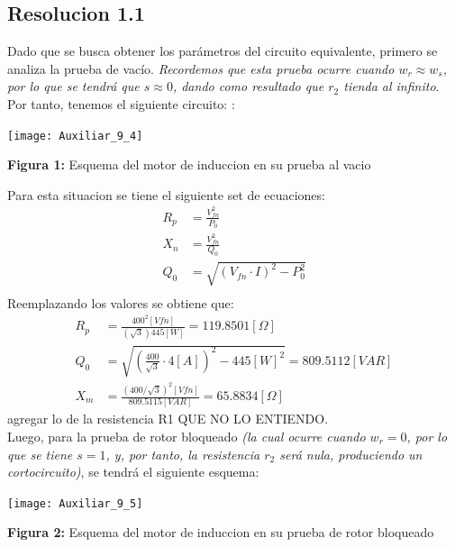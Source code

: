 \documentclass[
  11pt,
  letterpaper,
   addpoints,
   answers
  ]{exam}
\begin{document}
\begin{questions}
\begin{solution}
        \subsection*{Resolucion 1.1}
        Dado que se busca obtener los parámetros del circuito equivalente, primero se analiza la prueba de vacío. 
        \textit{Recordemos que esta prueba ocurre cuando \( w_r \approx w_s \), por lo que se tendrá que \( s \approx 0 \), dando como resultado que \( r_2 \) tienda al infinito}. Por tanto, tenemos el siguiente circuito:
        :
        \begin{center}
            \texttt{[image: Auxiliar\_9\_4]}
        \end{center}
        \begin{center}
            \textbf{Figura 1:} Esquema del motor de induccion en su prueba al vacio
        \end{center}
        Para esta situacion se tiene el siguiente set de ecuaciones:
        \begin{align}
            R_{p} &= \frac{V_{fn}^{2}}{P_{0}}\\
            X_{n} &= \frac{V_{fn}^{2}}{Q_{0}}\\
            Q_{0} &= \sqrt{(V_{fn} \cdot I)^{2} - P_{0}^{2}}\\
        \end{align}
        Reemplazando los valores se obtiene que:
        \begin{align}
            R_{p} &= \frac{400^{2}[Vfn]}{(\sqrt{3})445[W]} = 119.8501[\Omega]\\
            Q_{0} &= \sqrt{\left(\frac{400}{\sqrt{3}} \cdot 4[A]\right)^{2} - 445[W]^{2}} = 809.5112[VAR]\\
            X_{m} &= \frac{(400/\sqrt{3})^{2}[Vfn]}{809.5115[VAR]} = 65.8834[\Omega]
        \end{align}
        agregar lo de la resistencia R1 QUE NO LO ENTIENDO.\\
        Luego, para la prueba de rotor bloqueado \textit{(la cual ocurre cuando \( w_r = 0 \), por lo que se tiene \( s = 1 \), 
        y, por tanto, la resistencia \( r_2 \) será nula, produciendo un cortocircuito)}, se tendrá el siguiente esquema:        
        \begin{center}
            \texttt{[image: Auxiliar\_9\_5]}
        \end{center}
        \begin{center}
            \textbf{Figura 2:} Esquema del motor de induccion en su prueba de rotor bloqueado

\end{center}
\end{solution}
\end{questions}
\end{document}
